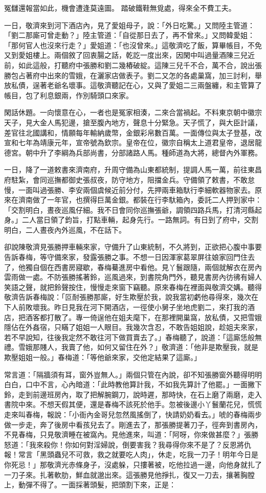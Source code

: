 冤讎還報當如此，機會遭逢莫遠圖。
踏破鐵鞋無覓處，得來全不費工夫。

一日，敬濟來到河下酒店內，見了愛姐母子，說：「外日吃驚。」又問陸主管道：「劉二那廝可曾走動？」陸主管道：「自從那日去了，再不曾來。」又問韓愛姐： 「那何官人也沒來行走？」愛姐道：「也沒曾來。」這敬濟吃了飯，算畢帳目，不免又到愛姐樓上。兩個敘了回衷腸之話，乾訖一度出來，因閑中叫過量酒陳三兒近前，如此這般，打聽府中張勝和劉二幾樁破綻。這陳三兒千不合，萬不合，說出張勝包占著府中出來的雪娥，在灑家店做表子。劉二又怎的各處巢窩，加三討利，舉放私債，逞著老爺名壞事。這敬濟聽記在心，又與了愛姐二三兩盤纏，和主管算了帳目，包了利息銀兩，作別騎頭口來家。

閑話休題。一向懷意在心，一者也是冤家相湊，二來合當禍起。不料東京朝中徽宗天子，見大金人馬犯邊，搶至腹內地方，聲息十分緊急。天子慌了，與大臣計議，差官往北國講和，情願每年輸納歲幣，金銀彩帛數百萬。一面傳位與太子登基，改宣和七年為靖康元年，宣帝號為欽宗。皇帝在位，徽宗自稱太上道君皇帝，退居龍德宮。朝中升了李綱為兵部尚書，分部諸路人馬。種師道為大將，總督內外軍務。

一日，降了一道敕書來濟南府，升周守備為山東都統制，提調人馬一萬，前往東昌府駐紮，會同巡撫都御史張叔夜，防守地方，阻擋金兵。守備領了敕書，不敢怠慢，一面叫過張勝、李安兩個虞候近前分付，先押兩車箱馱行李細軟器物家去。原來在濟南做了一年官，也撰得巨萬金銀。都裝在行李馱箱內，委託二人押到家中： 「交割明白，晝夜巡風仔細。我不日會同你巡撫張爺，調領四路兵馬，打清河縣起身。」二人當日領了鈞旨，打點車輛，起身先行。一路無詞。有日到了府中，交割明白，二人晝夜內外巡風，不在話下。

卻說陳敬濟見張勝押車輛來家，守備升了山東統制，不久將到，正欲把心腹中事要告訴春梅，等守備來家，發露張勝之事。不想一日因渾家葛翠屏往娘家回門住去了，他獨自個在西書房寢歇，春梅驀進房中看他。見丫鬟跟隨，兩個就解衣在房內雲雨做一處。不防張勝搖著鈴，巡風過來，到書院角門外，聽見書房內彷彿有婦人笑語之聲，就把鈴聲按住，慢慢走來窗下竊聽。原來春梅在裡面與敬濟交媾。聽得敬濟告訴春梅說：「叵耐張勝那廝，好生欺壓於我，說我當初虧他尋得來，幾次在下人前敗壞我。昨日見我在河下開酒店，一徑使小舅子坐地虎劉二，來打我的酒店，把酒客都打散了。專一倚逞他在姐夫麾下，在那裡開巢窩，放私債，又把雪娥隱佔在外姦宿，只瞞了姐姐一人眼目。我幾次含忍，不敢告姐姐說，趁姐夫來家，若不早說知，往後我定然不敢往河下做買賣去了。」春梅聽了，說道：「這廝恁般無禮。雪娥那賤人，我賣了他，如何又留住在外？」敬濟道：「他非是欺壓我，就是欺壓姐姐一般。」春梅道：「等他爺來家，交他定結果了這廝。」

常言道：「隔牆須有耳，窗外豈無人。」兩個只管在內說，卻不知張勝窗外聽得明明白白，口中不言，心內暗道：「此時教他算計我，不如我先算計了他罷。」一面撇下鈴，走到前邊班房內，取了把解腕鋼刀，說時遲，那時快，在石上磨了兩磨，走入書院中來。不想天假其便，還是春梅不該死於他手。忽被後邊小丫鬟蘭花兒，慌慌走來叫春梅，報說：「小衙內金哥兒忽然風搖倒了，快請奶奶看去。」唬的春梅兩步做一步走，奔了後房中看孩兒去了。剛進去了，那張勝提著刀子，徑奔到書房內，不見春梅，只見敬濟睡在被窩內。見他進來，叫道：「阿呀，你來做甚麼？」張勝怒道：「我來殺你！你如何對淫婦說，倒要害我？我尋得你來不是了？反恩將仇報！常言「黑頭蟲兒不可救，救之就要吃人肉」，休走，吃我一刀子！明年今日是你死忌！」那敬濟光赤條身子，沒處躲，只摟著被，吃他拉過一邊，向他身就扎了一刀子來。扎著軟肋，鮮血就邈出來。這張勝見他掙扎，復又一刀去，攘著胸膛上，動彈不得了。一面採著頭髮，把頭割下來，正是：

